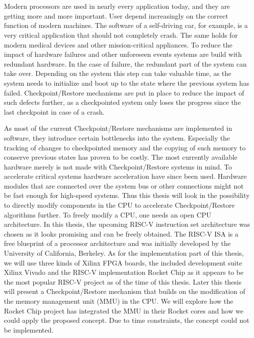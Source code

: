 \chapter{\abstractname}

Modern processors are used in nearly every application today,
and they are getting more and more important. User depend increasingly
on the correct function of modern machines. The software of a
self-driving car, for example, is a very critical application that should
not completely crash. The same holds for modern medical devices
and other mission-critical appliances.
To reduce the impact of hardware failures and other unforeseen events
systems are build with redundant hardware. In the case of failure,
the redundant part of the system can take over.
Depending on the system this step can take valuable time, as the
system needs to initialize and boot up to the state where the
previous system has failed.
Checkpoint/Restore mechanisms are put in place to reduce the impact
of such defects further, as a checkpointed system only loses the
progress since the last checkpoint in case of a crash.

As most of the current Checkpoint/Restore mechanisms are implemented
in software, they introduce certain bottlenecks into the system.
Especially the tracking of changes to checkpointed memory and the copying
of such memory to conserve previous states has proven to be costly.
The most currently available hardware merely is not made with
Checkpoint/Restore systems in mind.
To accelerate critical systems hardware acceleration have since been used.
Hardware modules that are connected over the system bus or other connections
might not be fast enough for high-speed systems. Thus this thesis
will look in the possibility to directly modify components in the CPU
to accelerate Checkpoint/Restore algorithms further.
To freely modify a CPU, one needs an open CPU architecture.
In this thesis, the upcoming RISC-V instruction set architecture was chosen
as it looks promising and can be freely obtained. The RISC-V ISA is a
free blueprint of a processor architecture and was initially developed
by the University of California, Berkeley. As for the implementation
part of this thesis, we will use three kinds of Xilinx FPGA boards, the included
development suite Xilinx Vivado and the RISC-V implementation
Rocket Chip as it appears to be the most popular RISC-V project as of the time of
this thesis.
Later this thesis will present a Checkpoint/Restore mechanism that
builds on the modification of the memory management unit (MMU) in the CPU.
We will explore how the Rocket Chip project has integrated
the MMU in their Rocket cores and how we could apply the proposed concept.
Due to time constraints, the concept could not be implemented.
